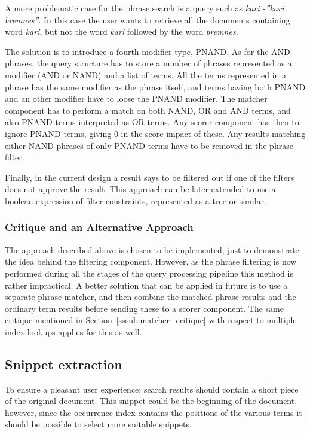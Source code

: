 A more problematic case for the phrase search is a query such as {\it kari -''kari bremnes''}. In this case the user wants to retrieve all the documents containing word {\it kari}, but not the word {\it kari} followed by the word {\it bremnes}.

The solution is to introduce a fourth modifier type, PNAND. As for the AND phrases, the query structure has to store a number of phrases represented as a modifier (AND or NAND) and a list of terms. All the terms represented in a phrase has the same modifier as the phrase itself, and terms having both PNAND and an other modifier have to loose the PNAND modifier. The matcher component has to perform a match on both NAND, OR and AND terms, and also PNAND terms interpreted as OR terms. Any scorer component has then to ignore PNAND terms, giving 0 in the score impact of these. Any results matching either NAND phrases of only PNAND terms have to be removed in the phrase filter.

Finally, in the current design a result says to be filtered out if one of the filters does not approve the result. This approach can be later extended to use a boolean expression of filter constraints, represented as a tree or similar.

\subsubsection{Critique and an Alternative Approach}
The approach described above is chosen to be implemented, just to demonstrate the idea behind the filtering component. However, as the phrase filtering is now performed during all the stages of the query processing pipeline this method is rather impractical. A better solution that can be applied in future is to use a separate phrase matcher, and then combine the matched phrase results and the ordinary term results before sending these to a scorer component. The same critique mentioned in Section~\ref{sssub:matcher_critique} with respect to multiple index lookups applies for this as well.

\subsection{Snippet extraction}\label{sub:snippet_extraction}
To ensure a pleasant user experience; search results should contain a short piece of the original document. This snippet could be the beginning of the document, however, since the occurrence index contains the positions of the various terms it should be possible to select more suitable snippets. 

